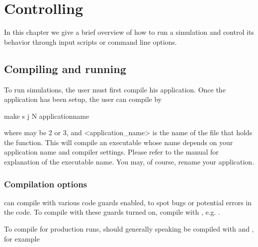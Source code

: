 \documentclass[letterpaper,10pt,english]{sphinxmanual}
\begin{document}
\section{Controlling }
\label{\detokenize{Base/Control:controlling-chombo-discharge}}\label{\detokenize{Base/Control:chap-control}}\label{\detokenize{Base/Control::doc}}
In this chapter we give a brief overview of how to run a  simulation and control its behavior through input scripts or command line options.


\subsection{Compiling and running}
\label{\detokenize{Base/Control:compiling-and-running}}
To run simulations, the user must first compile his application.
Once the application has been setup, the user can compile by

\begin{sphinxVerbatim}[commandchars=\\\{\},formatcom=\scriptsize]
make \PYGZhy{}s \PYGZhy{}j  N \PYGZlt{}application\PYGZus{}name\PYGZgt{}
\end{sphinxVerbatim}

where  may be 2 or 3, and \textless{}application\_name\textgreater{} is the name of the file that holds the  function.
This will compile an executable whose name depends on your application name and compiler settings.
Please refer to the  manual for explanation of the executable name. You may, of course, rename your application.


\subsubsection{Compilation options}
\label{\detokenize{Base/Control:compilation-options}}
 can compile with various code guards enabled, to spot bugs or potential errors in the code.
To compile with these guards turned on, compile with , e.g. .

To compile for production runs,  should generally speaking be compiled with  and , for example
\end{document}
